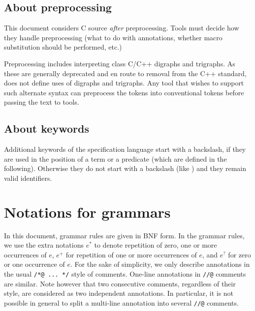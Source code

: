 

\subsection{About preprocessing}

This document considers C source \emph{after} preprocessing.
Tools must decide how they handle preprocessing (what to do with
annotations, whether macro substitution should be performed, etc.)

Preprocessing includes interpreting class C/C++ digraphs and trigraphs.
As these are generally deprecated and en route to removal from the C++
standard, \NAME{} does not define uses of digraphs and trigraphs. Any tool that wishes to support such alternate syntax can preprocess the tokens into conventional tokens before passing the text to \NAME{} tools.

\subsection{About keywords}

Additional keywords of the specification language start with a
backslash, if they are used in the position of a term or a predicate
(which are defined in the following).  Otherwise they do not start
with a backslash (like \ensures{}) and they remain valid identifiers.

\section{Notations for grammars}

In this document, grammar rules are given in BNF form. In the grammar
rules, we use the extra notations $e^*$ to denote repetition of zero, one
or more occurrences of $e$, $e^+$ for repetition of one or more
occurrences of $e$, and $e^?$ for zero or one occurrence of $e$.  For
the sake of simplicity, we only describe annotations in the usual
\lstinline|/*@ ... */| style of comments. One-line annotations
in \lstinline|//@| comments are similar. Note however that two consecutive
comments, regardless of their style, are considered as two independent
annotations. In particular, it is not possible in general to split a multi-line
annotation into several \lstinline|//@| comments.

